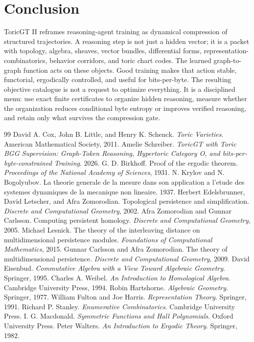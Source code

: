 \documentclass[10pt]{article}
\numberwithin{equation}{section}
\begin{document}
\section{Conclusion}
ToricGT II reframes reasoning-agent training as dynamical compression of structured trajectories. A reasoning step is not just a hidden vector; it is a packet with topology, algebra, sheaves, vector bundles, differential forms, representation-combinatorics, behavior corridors, and toric chart codes. The learned graph-to-graph function acts on these objects. Good training makes that action stable, functorial, ergodically controlled, and useful for bits-per-byte. The resulting objective catalogue is not a request to optimize everything. It is a disciplined menu: use exact finite certificates to organize hidden reasoning, measure whether the organization reduces conditional byte entropy or improves verified reasoning, and retain only what survives the compression gate.

\begin{thebibliography}{99}
 David A. Cox, John B. Little, and Henry K. Schenck. \emph{Toric Varieties}. American Mathematical Society, 2011.
 Amelie Schreiber. \emph{ToricGT with Toric BGG Supervision: Graph-Token Reasoning, Hypertoric Category O, and bits-per-byte-constrained Training}. 2026.
 G. D. Birkhoff. Proof of the ergodic theorem. \emph{Proceedings of the National Academy of Sciences}, 1931.
 N. Krylov and N. Bogolyubov. La theorie generale de la mesure dans son application a l'etude des systemes dynamiques de la mecanique non lineaire. 1937.
 Herbert Edelsbrunner, David Letscher, and Afra Zomorodian. Topological persistence and simplification. \emph{Discrete and Computational Geometry}, 2002.
 Afra Zomorodian and Gunnar Carlsson. Computing persistent homology. \emph{Discrete and Computational Geometry}, 2005.
 Michael Lesnick. The theory of the interleaving distance on multidimensional persistence modules. \emph{Foundations of Computational Mathematics}, 2015.
 Gunnar Carlsson and Afra Zomorodian. The theory of multidimensional persistence. \emph{Discrete and Computational Geometry}, 2009.
 David Eisenbud. \emph{Commutative Algebra with a View Toward Algebraic Geometry}. Springer, 1995.
 Charles A. Weibel. \emph{An Introduction to Homological Algebra}. Cambridge University Press, 1994.
 Robin Hartshorne. \emph{Algebraic Geometry}. Springer, 1977.
 William Fulton and Joe Harris. \emph{Representation Theory}. Springer, 1991.
 Richard P. Stanley. \emph{Enumerative Combinatorics}. Cambridge University Press.
 I. G. Macdonald. \emph{Symmetric Functions and Hall Polynomials}. Oxford University Press.
 Peter Walters. \emph{An Introduction to Ergodic Theory}. Springer, 1982.
\end{thebibliography}
\end{document}
